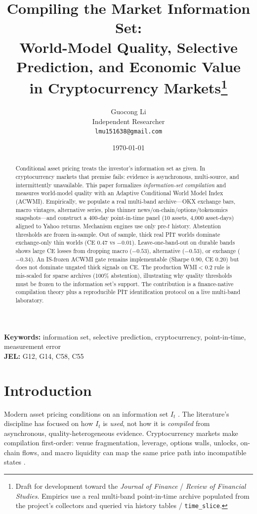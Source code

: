 \documentclass[12pt]{article}
\title{Compiling the Market Information Set:\\
World-Model Quality, Selective Prediction, and Economic Value\\
in Cryptocurrency Markets\footnote{Draft for development toward the \textit{Journal of Finance} / \textit{Review of Financial Studies}. Empirics use a real multi-band point-in-time archive populated from the project's collectors and queried via history tables / \texttt{time\_slice}.}}
\author{Guocong Li\\
Independent Researcher\\
\texttt{lmu151638@gmail.com}}
\date{\today}
\begin{document}
\maketitle

\begin{abstract}
Conditional asset pricing treats the investor's information set as given. In cryptocurrency markets that premise fails: evidence is asynchronous, multi-source, and intermittently unavailable. This paper formalizes \emph{information-set compilation} and measures world-model quality with an Adaptive Conditional World Model Index (ACWMI). Empirically, we populate a real multi-band archive---OKX exchange bars, macro vintages, alternative series, plus thinner news/on-chain/options/tokenomics snapshots---and construct a 400-day point-in-time panel (10 assets, 4{,}000 asset-days) aligned to Yahoo returns. Mechanism engines use only pre-$t$ history. Abstention thresholds are frozen in-sample. Out of sample, thick real PIT worlds dominate exchange-only thin worlds (CE $0.47$ vs $-0.01$). Leave-one-band-out on durable bands shows large CE losses from dropping macro ($-0.53$), alternative ($-0.53$), or exchange ($-0.34$). An IS-frozen ACWMI gate remains implementable (Sharpe $0.90$, CE $0.20$) but does not dominate ungated thick signals on CE. The production WMI$<0.2$ rule is mis-scaled for sparse archives (100\% abstention), illustrating why quality thresholds must be frozen to the information set's support. The contribution is a finance-native compilation theory plus a reproducible PIT identification protocol on a live multi-band laboratory.
\end{abstract}

\noindent\textbf{Keywords:} information set, selective prediction, cryptocurrency, point-in-time, measurement error\\
\textbf{JEL:} G12, G14, C58, C55

\section{Introduction}

Modern asset pricing conditions on an information set $I_t$ \citep{fama1993,cochrane2005,gu2020,kelly2019,nagel2021}. The literature's discipline has focused on how $I_t$ is \emph{used}, not how it is \emph{compiled} from asynchronous, quality-heterogeneous evidence. Cryptocurrency markets make compilation first-order: venue fragmentation, leverage, options walls, unlocks, on-chain flows, and macro liquidity can map the same price path into incompatible states \citep{makarov2020,liu2022}.
\end{document}
